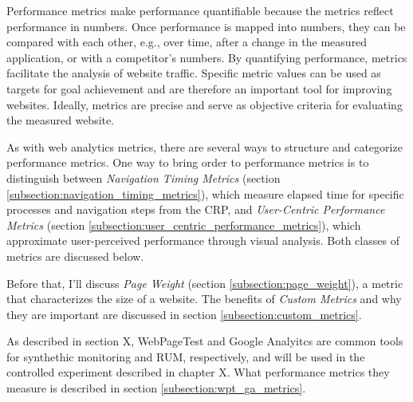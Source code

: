 
Performance metrics make performance quantifiable because the metrics reflect performance in numbers.
Once performance is mapped into numbers, they can be compared with each other, e.g., over time, after a change in the measured application, or with a competitor's numbers. %
By quantifying performance, metrics facilitate the analysis of website traffic.
Specific metric values can be used as targets for goal achievement and are therefore an important tool for improving websites. %
Ideally, metrics are precise and serve as objective criteria for evaluating the measured website. %



As with web analytics metrics, there are several ways to structure and categorize performance metrics.
One way to bring order to performance metrics is to distinguish between \textit{Navigation Timing Metrics} (section \ref{subsection:navigation_timing_metrics}), which measure elapsed time for specific processes and navigation steps from the CRP, and \textit{User-Centric Performance Metrics} (section \ref{subsection:user_centric_performance_metrics}), which approximate user-perceived performance through visual analysis.
Both classes of metrics are discussed below.

Before that, I'll discuss \textit{Page Weight} (section \ref{subsection:page_weight}), a metric that characterizes the size of a website.
The benefits of \textit{Custom Metrics }and why they are important are discussed in section \ref{subsection:custom_metrics}.

As described in section X, WebPageTest and Google Analyitcs are common tools for synthethic monitoring and RUM, respectively, and will be used in the controlled experiment described in chapter X.
What performance metrics they measure is described in section \ref{subsection:wpt_ga_metrics}.






